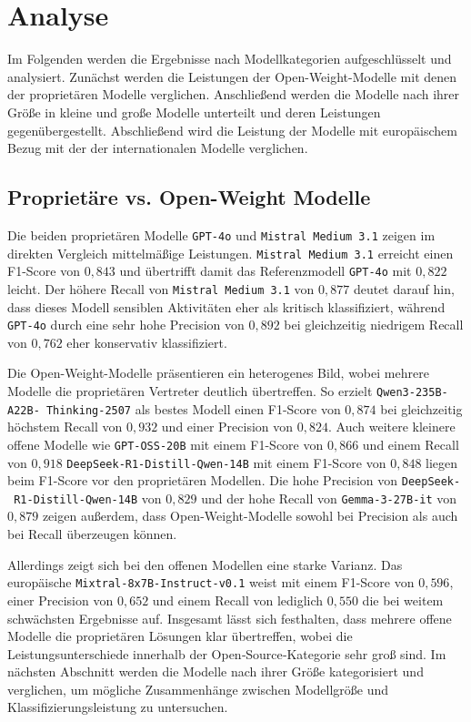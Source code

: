\section{Analyse}\label{sec:analyse}

Im Folgenden werden die Ergebnisse nach Modellkategorien aufgeschlüsselt und analysiert. Zunächst werden die Leistungen der Open-Weight-Modelle mit denen der proprietären Modelle verglichen. Anschließend werden die Modelle nach ihrer Größe in kleine und große Modelle unterteilt und deren Leistungen gegenübergestellt. Abschließend wird die Leistung der Modelle mit europäischem Bezug mit der der internationalen Modelle verglichen.

\subsection*{Proprietäre vs. Open-Weight Modelle}

Die beiden proprietären Modelle \texttt{GPT-4o} und \texttt{Mistral Medium 3.1} zeigen im direkten Vergleich mittelmäßige Leistungen. \texttt{Mistral Medium 3.1} erreicht einen F1-Score von $0{,}843$ und übertrifft damit das Referenzmodell \texttt{GPT-4o} mit $0{,}822$ leicht. Der höhere Recall von \texttt{Mistral Medium 3.1} von $0{,}877$ deutet darauf hin, dass dieses Modell sensiblen Aktivitäten eher als kritisch klassifiziert, während \texttt{GPT-4o} durch eine sehr hohe Precision von $0{,}892$ bei gleichzeitig niedrigem Recall von $0{,}762$ eher konservativ klassifiziert.

Die Open-Weight-Modelle präsentieren ein heterogenes Bild, wobei mehrere Modelle die proprietären Vertreter deutlich übertreffen. So erzielt \texttt{Qwen3-235B-A22B-\linebreak~Thinking-2507} als bestes Modell einen F1-Score von $0{,}874$ bei gleichzeitig höchstem Recall von $0{,}932$ und einer Precision von $0{,}824$. Auch weitere kleinere offene Modelle wie \texttt{GPT-OSS-20B} mit einem F1-Score von $0{,}866$ und einem Recall von $0{,}918$ \texttt{DeepSeek-R1-Distill-Qwen-14B} mit einem F1-Score von $0{,}848$ liegen beim F1-Score vor den proprietären Modellen. Die hohe Precision von \texttt{DeepSeek-\linebreak~R1-Distill-Qwen-14B} von $0{,}829$ und der hohe Recall von \texttt{Gemma-3-27B-it} von $0{,}879$ zeigen außerdem, dass Open-Weight-Modelle sowohl bei Precision als auch bei Recall überzeugen können.

Allerdings zeigt sich bei den offenen Modellen eine starke Varianz. Das europäische \texttt{Mixtral-8x7B-Instruct-v0.1} weist mit einem F1-Score von $0{,}596$, einer Precision von $0{,}652$ und einem Recall von lediglich $0{,}550$ die bei weitem schwächsten Ergebnisse auf. Insgesamt lässt sich festhalten, dass mehrere offene Modelle die proprietären Lösungen klar übertreffen, wobei die Leistungsunterschiede innerhalb der Open‑Source‑Kategorie sehr groß sind. Im nächsten Abschnitt werden die Modelle nach ihrer Größe kategorisiert und verglichen, um mögliche Zusammenhänge zwischen Modellgröße und Klassifizierungsleistung zu untersuchen.

